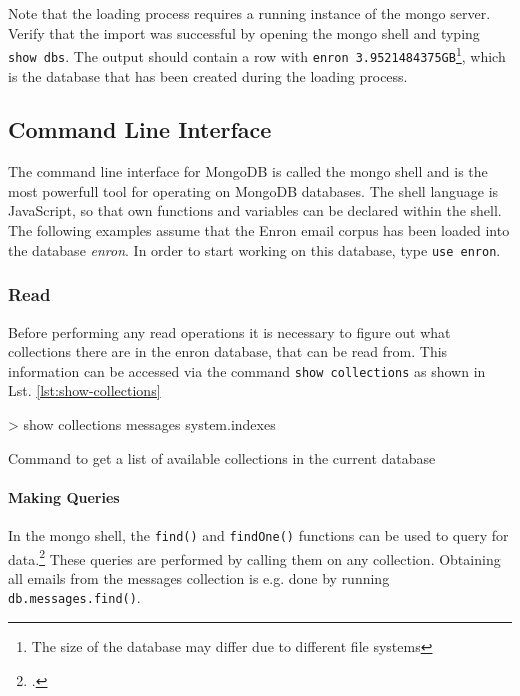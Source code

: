 Note that the loading process requires a running instance of the mongo server.
Verify that the import was successful by opening the mongo shell and typing
\texttt{show dbs}.
The output should contain a row with \texttt{enron 3.9521484375GB}\footnote{The
size of the database may differ due to different file systems}, which is the
database that has been created during the loading process.


\subsection{Command Line Interface}
\label{sec:usage-cli}

The command line interface for MongoDB is called the mongo shell and is the most powerfull
tool for operating on MongoDB databases. The shell language is JavaScript, so that own
functions and variables can be declared within the shell.
The following examples assume that the Enron email corpus has been loaded into the database \textit{enron}.
In order to start working on this database, type \texttt{use enron}.

\subsubsection{Read}
Before performing any read operations it is necessary to figure out what collections
there are in the enron database, that can be read from. This information can be accessed
via the command \texttt{show collections} as shown in Lst. \ref{lst:show-collections}

\begin{listing}
    \begin{javascriptcode}
> show collections
messages
system.indexes
    \end{javascriptcode}
    \caption{Command to get a list of available collections in the current database}
    \label{lst:show-collections}
\end{listing}

\paragraph{Making Queries}
In the mongo shell, the \texttt{find()} and \texttt{findOne()} functions can be used to
query for data.\footcite[Cf.][7]{mongo_crud_manual}
These queries are performed by calling them on any collection.
Obtaining all emails from the messages collection is e.g. done by running
\texttt{db.messages.find()}.


